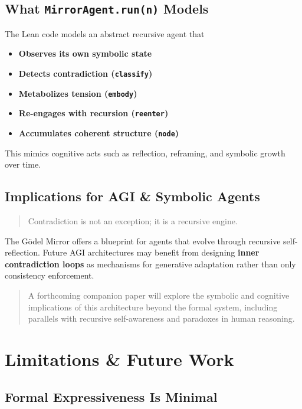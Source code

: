 \documentclass[manuscript,nonacm]{acmart}
\begin{document}
\subsection{What \texttt{MirrorAgent.run(n)} Models}

The Lean code models an abstract recursive agent that

\begin{itemize}
\item \textbf{Observes its own symbolic state}
\item \textbf{Detects contradiction (\texttt{classify})}
\item \textbf{Metabolizes tension (\texttt{embody})}
\item \textbf{Re-engages with recursion (\texttt{reenter})}
\item \textbf{Accumulates coherent structure (\texttt{node})}
\end{itemize}

This mimics cognitive acts such as reflection, reframing, and symbolic growth over time.

\subsection{Implications for AGI \& Symbolic Agents}

\begin{quote}
Contradiction is not an exception; it is a recursive engine.
\end{quote}

The Gödel Mirror offers a blueprint for agents that evolve through recursive self-reflection. Future AGI architectures may benefit from designing \textbf{inner contradiction loops} as mechanisms for generative adaptation rather than only consistency enforcement.

\begin{quote}
A forthcoming companion paper will explore the symbolic and cognitive implications of this architecture beyond the formal system, including parallels with recursive self-awareness and paradoxes in human reasoning.
\end{quote}

\section{Limitations \& Future Work}

\subsection{Formal Expressiveness Is Minimal}
\end{document}
